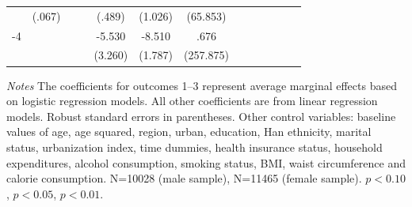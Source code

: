 \begin{table}[p]
\begin{adjustbox}{max width=\linewidth}
\begin{threeparttable}
{\begin{tabular}{l*{6}{SS}}
                &   (.067)         &           &          &   (.489)         &  (1.026)         & (65.853)         \\
-4             &              &              &              &   -5.530\sym{*}  &   -8.510\sym{***}&     .676         \\
                &             &               &              &  (3.260)         &  (1.787)         &(257.875)         \\    
\bottomrule
\end{tabular}
\begin{tablenotes}
\item \footnotesize \textit{Notes} The coefficients for outcomes 1--3 represent average marginal effects based on logistic regression models. All other coefficients are from linear regression models. Robust standard errors in parentheses.
Other control variables: baseline values of age, age squared, region, urban, education, Han ethnicity, marital status, urbanization index, time dummies, health insurance status, household expenditures, alcohol consumption, smoking status, BMI, waist circumference and calorie consumption. N=10028 (male sample), N=11465 (female sample). \sym{*} \(p<0.10\), \sym{**} \(p<0.05\), \sym{***} \(p<0.01\).
\end{tablenotes}
}
\end{threeparttable}
\end{adjustbox}
\end{table}

\clearpage

